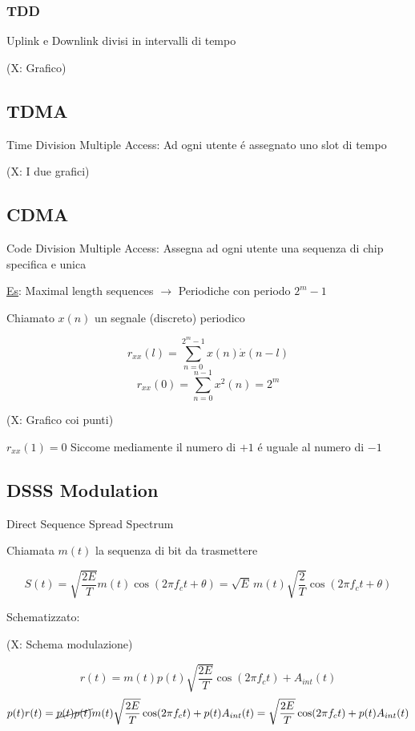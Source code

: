 \documentclass{article}
\begin{document}
\subsubsection{TDD}
Uplink e Downlink divisi in intervalli di tempo

(X: Grafico)

\subsection{TDMA}
Time Division Multiple Access: Ad ogni utente \'e assegnato uno slot di tempo

(X: I due grafici)

\subsection{CDMA}
Code Division Multiple Access: Assegna ad ogni utente una sequenza di chip specifica e unica

\underline{Es}: Maximal length sequences $\rightarrow$ Periodiche con periodo $2^m -1$

Chiamato $x(n)$ un segnale (discreto) periodico

\begin{minipage}{0.5\textwidth}
\[ r_{xx}(l) = \sum^{2^m-1}_{n=0}  x(n)\dot x(n -l)\]
\[ r_{xx}(0) = \sum^{n-1}_{n=0} x^2(n) = 2^m \]
\end{minipage}
\begin{minipage}{0.5\textwidth}
    (X: Grafico coi punti)
\end{minipage}

$r_{xx}(1)= 0$ Siccome mediamente il numero di $+1$ \'e uguale al numero di $-1$

\subsection{DSSS Modulation}
Direct Sequence Spread Spectrum

Chiamata $m(t)$ la sequenza di bit da trasmettere

\[S(t) = \sqrt{\frac{2E}{T}} m(t)\cos(2\pi f_c t + \theta) = \sqrt{E}\,m(t)\sqrt{\frac{2}{T}}\cos(2\pi f_c t + \theta)\]

Schematizzato:

(X: Schema modulazione)

\[r(t) = m(t)p(t)\sqrt{\frac{2E}{T}}\cos(2\pi f_c t) + A_{int}(t) \]
\[p(t)r(t) = \cancel{p(t) p(t)}m(t) \sqrt{\frac{2E}{T}}\cos(2\pi f_c t) + p(t)A_{int}(t)
= \sqrt{\frac{2E}{T}}\cos(2\pi f_c t) + p(t)A_{int}(t) \]
\end{document}
